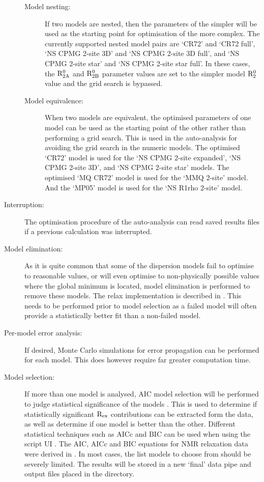 \begin{description}
\begin{description}
\item[Model nesting:]  If two models are nested, then the parameters of the simpler will be used as the starting point for optimisation of the more complex.  The currently supported nested model pairs are `CR72' and `CR72 full', `NS CPMG 2-site 3D' and `NS CPMG 2-site 3D full', and `NS CPMG 2-site star' and `NS CPMG 2-site star full'.  In these cases, the $\mathrm{R}_\mathrm{2A}^0$ and $\mathrm{R}_\mathrm{2B}^0$ parameter values are set to the simpler model $\mathrm{R}_2^0$ value and the grid search is bypassed.
\item[Model equivalence:]  When two models are equivalent, the optimised parameters of one model can be used as the starting point of the other rather than performing a grid search.  This is used in the auto-analysis for avoiding the grid search in the numeric models.  The optimised `CR72' model is used for the `NS CPMG 2-site expanded', `NS CPMG 2-site 3D', and  `NS CPMG 2-site star' models.  The optimised `MQ CR72' model is used for the `MMQ 2-site' model.  And the `MP05' model is used for the `NS R1rho 2-site' model.
\end{description}
\item[Interruption:]  The optimisation procedure of the auto-analysis can read saved results files if a previous calculation was interrupted.
\item[Model elimination:]  As it is quite common that some of the dispersion models fail to optimise to reasonable values, or will even optimise to non-physically possible values where the global minimum is located, model elimination is performed to remove these models.  The relax implementation is described in \citet{dAuvergneGooley06}.  This needs to be performed prior to model selection as a failed model will often provide a statistically better fit than a non-failed model.
\item[Per-model error analysis:]  If desired, Monte Carlo simulations for error propagation can be performed for each model.  This does however require far greater computation time.
\item[Model selection:]  If more than one model is analysed, AIC model selection will be performed to judge statistical significance of the models \citep{Akaike73}.  This is used to determine if statistically significant $\mathrm{R}_\textrm{ex}$ contributions can be extracted form the data, as well as determine if one model is better than the other.  Different statistical techniques such as AICc and BIC can be used when using the script UI \citep{HurvichTsai89,Schwarz78}.  The AIC, AICc and BIC equations for NMR relaxation data were derived in \citet{dAuvergneGooley03}.  In most cases, the list models to choose from should be severely limited.  The results will be stored in a new `final' data pipe and output files placed in the  directory.

\end{description}
